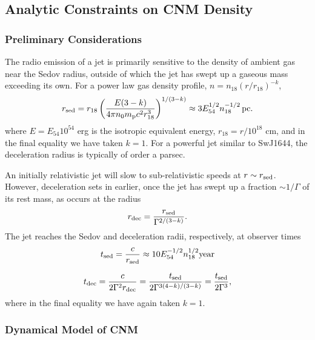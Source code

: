 \documentclass[usenatbib,fleqn]{mnras}
\begin{document}
\subsection{Analytic Constraints on CNM Density}
\label{sec:analy}

\subsubsection{Preliminary Considerations}

The radio emission of a jet is primarily sensitive to the density of
ambient gas near the Sedov radius, outside of which the jet has
swept up a gaseous mass exceeding its own. For a power law gas density
profile, $n= n_{18} \left(r/r_{18}\right)^{-k}$,
\begin{equation}
  r_{\rm sed} = r_{18} \left( \frac{E(3-k)}{4\pi n_{0}
      m_{\rm p} c^2 r_{18}^3} \right)^{1/(3-k)} \approx 3 E_{54}^{1/2} n_{\rm 18}^{-1/2}\,{\rm pc}. 
  \label{eq:rdec}
\end{equation}
where $E = E_{54}10^{54}$ erg is the isotropic equivalent energy,
$r_{18} = r/10^{18}$ cm, and in the final equality we have taken $k =
1$.  For a powerful jet similar to SwJ1644, the deceleration radius is
typically of order a parsec.

An initially relativistic jet will slow to sub-relativistic speeds at
$r \sim r_{\rm sed}$.  However, deceleration sets in earlier, once the
jet has swept up a fraction $\sim 1/\Gamma$ of its rest mass, as
occurs at the radius
\begin{equation}
  r_{\rm dec}=\frac{r_{\rm sed}}{\Gamma^{2/(3-k)}}.
  \label{eq:rdec2}
\end{equation}
%
The jet reaches
 the Sedov and deceleration radii, respectively, at
observer times 
\begin{equation}
t_{\rm sed} = \frac{c}{r_{\rm sed}} \approx
10 E_{54}^{-1/2}n_{18}^{1/2} {\rm year}
 \end{equation} 

\begin{equation}
t_{\rm dec} =
\frac{c}{2\Gamma^{2} r_{\rm dec}} = \frac{t_{\rm
    sed}}{2\Gamma^{3(4-k)/(3-k)}} = \frac{t_{\rm sed}}{2\Gamma^{3}},
 \label{eq:tdec}
\end{equation}
%
where in the final equality we have again taken $k = 1$.


\subsubsection{Dynamical Model of CNM}
\label{sec:model}
\end{document}
